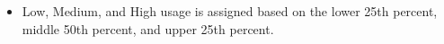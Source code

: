 \begin{itemize}
\item Low, Medium, and High usage is assigned based on the lower 25th percent, middle 50th percent, and upper 25th percent.
\end{itemize}
